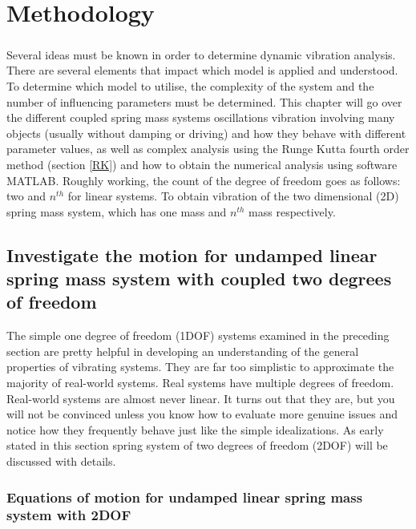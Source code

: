 \chapter{Methodology}
\label{chap:03}
\paragraph{}

Several ideas must be known in order to determine dynamic vibration analysis. There are several elements that impact which model is applied and understood. To determine which model to utilise, the complexity of the system and the number of influencing parameters must be determined. This chapter will go over the different coupled spring mass systems oscillations vibration involving many objects (usually without damping or driving) and how they behave with different parameter values, as well as complex analysis using the Runge Kutta fourth order method (section \ref{RK}) and how to obtain the numerical analysis using software MATLAB. Roughly working, the count of the degree of freedom goes as follows: two and $n^{th}$ for linear systems. To obtain vibration of the two dimensional (2D) spring mass system, which has  one mass and  $n^{th}$ mass respectively. 




\section{Investigate the motion for undamped linear spring mass system with  coupled two degrees of freedom}
\label{2DOF}

The simple one degree of freedom (1DOF) \cite{tsai2020design} systems examined in the preceding section are pretty helpful in developing an understanding of the general properties of vibrating systems. They are far too simplistic to approximate the majority of real-world systems. Real systems have multiple degrees of freedom. Real-world systems are almost never linear. It turns out that they are, but you will not be convinced unless you know how to evaluate more genuine issues and notice how they frequently behave just like the simple idealizations. As early stated in this section spring system of two degrees of freedom (2DOF) \cite{eiss1964vibration} will be discussed with details. 

\subsection{Equations of motion for undamped linear spring mass system with 2DOF }

